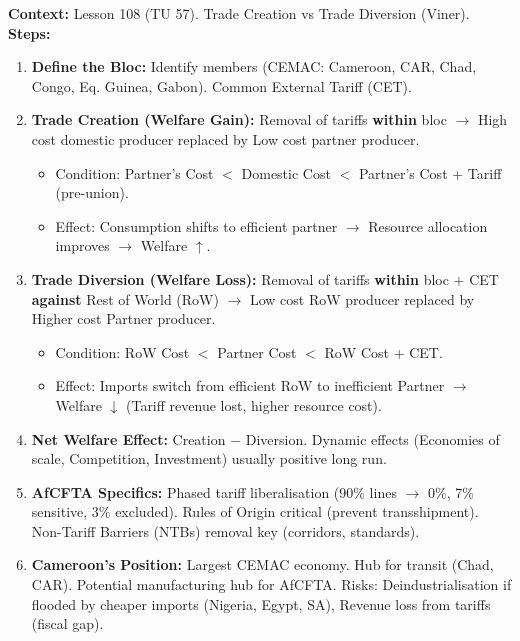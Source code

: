 \documentclass[11pt]{article}
\begin{document}
\begin{methode}
\textbf{Context:} Lesson 108 (TU 57). Trade Creation vs Trade Diversion (Viner).
\textbf{Steps:}
\begin{enumerate}
    \item \textbf{Define the Bloc:} Identify members (CEMAC: Cameroon, CAR, Chad, Congo, Eq. Guinea, Gabon). Common External Tariff (CET).
    \item \textbf{Trade Creation (Welfare Gain):} Removal of tariffs \textbf{within} bloc $\rightarrow$ High cost domestic producer replaced by Low cost partner producer.
        \begin{itemize}
            \item Condition: Partner's Cost $<$ Domestic Cost $<$ Partner's Cost + Tariff (pre-union).
            \item Effect: Consumption shifts to efficient partner $\rightarrow$ Resource allocation improves $\rightarrow$ Welfare $\uparrow$.
        \end{itemize}
    \item \textbf{Trade Diversion (Welfare Loss):} Removal of tariffs \textbf{within} bloc + CET \textbf{against} Rest of World (RoW) $\rightarrow$ Low cost RoW producer replaced by Higher cost Partner producer.
        \begin{itemize}
            \item Condition: RoW Cost $<$ Partner Cost $<$ RoW Cost + CET.
            \item Effect: Imports switch from efficient RoW to inefficient Partner $\rightarrow$ Welfare $\downarrow$ (Tariff revenue lost, higher resource cost).
        \end{itemize}
    \item \textbf{Net Welfare Effect:} Creation $-$ Diversion. Dynamic effects (Economies of scale, Competition, Investment) usually positive long run.
    \item \textbf{AfCFTA Specifics:} Phased tariff liberalisation (90\% lines $\rightarrow$ 0\%, 7\% sensitive, 3\% excluded). Rules of Origin critical (prevent transshipment). Non-Tariff Barriers (NTBs) removal key (corridors, standards).
    \item \textbf{Cameroon's Position:} Largest CEMAC economy. Hub for transit (Chad, CAR). Potential manufacturing hub for AfCFTA. Risks: Deindustrialisation if flooded by cheaper imports (Nigeria, Egypt, SA), Revenue loss from tariffs (fiscal gap).
\end{enumerate}
\end{methode}
\end{document}

